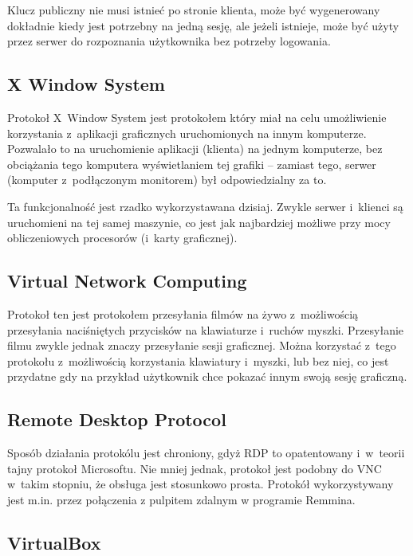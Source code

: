 \documentclass[a4paper,11pt]{article}
\begin{document}
Klucz publiczny nie musi istnieć po stronie klienta, może być wygenerowany
dokładnie kiedy jest potrzebny na jedną sesję, ale jeżeli istnieje, może
być użyty przez serwer do rozpoznania użytkownika bez potrzeby logowania.

\subsection{X Window System}

Protokoł X~Window System jest protokołem który miał na celu umożliwienie
korzystania z~aplikacji graficznych uruchomionych na innym komputerze.
Pozwalało to na uruchomienie aplikacji (klienta) na jednym komputerze,
bez obciążania tego komputera wyświetlaniem tej grafiki -- zamiast tego,
serwer (komputer z~podłączonym monitorem) był odpowiedzialny za to.

Ta funkcjonalność jest rzadko wykorzystawana dzisiaj. Zwykle serwer
i~klienci są uruchomieni na tej samej maszynie, co jest jak najbardziej
możliwe przy mocy obliczeniowych procesorów (i~karty graficznej).

\subsection{Virtual Network Computing}

Protokoł ten jest protokołem przesyłania filmów na żywo z~możliwością
przesyłania naciśniętych przycisków na klawiaturze i~ruchów myszki.
Przesyłanie filmu zwykle jednak znaczy przesyłanie sesji graficznej.
Można korzystać z~tego protokołu z~możliwością korzystania klawiatury
i~myszki, lub bez niej, co jest przydatne gdy na przykład użytkownik
chce pokazać innym swoją sesję graficzną.

\subsection{Remote Desktop Protocol}

Sposób działania protokólu jest chroniony, gdyż 
RDP to opatentowany i~w~teorii tajny protokoł Microsoftu. Nie mniej jednak,
protokoł jest podobny do VNC w~takim stopniu, że obsługa
jest stosunkowo prosta. Protokół wykorzystywany jest m.in. przez połączenia
z pulpitem zdalnym w programie Remmina.

\subsection{VirtualBox}
\end{document}
